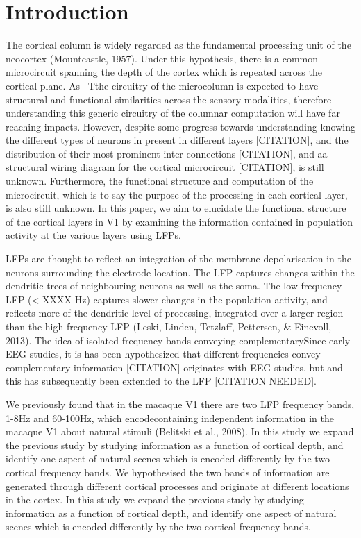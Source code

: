 \section{Introduction}
The cortical column is widely regarded as the fundamental processing unit of the neocortex (Mountcastle, 1957). Under this hypothesis, there is a common microcircuit spanning the depth of the cortex which is repeated across the cortical plane. As \ Tthe circuitry of the microcolumn is expected to have structural and functional similarities across the sensory modalities, therefore understanding this generic circuitry of the columnar computation will have far reaching impacts. However, despite some progress towards understanding knowing the different types of neurons in present in different layers [CITATION], and the distribution of their most prominent inter-connections [CITATION], and aa structural wiring diagram for the cortical microcircuit [CITATION], is still unknown. Furthermore, the functional structure and computation of the microcircuit, which is to say the purpose of the processing in each cortical layer, is also still unknown. In this paper, we aim to elucidate the functional structure of the cortical layers in \ac{V1} by examining the information contained in population activity at the various layers using \acp{LFP}.

\acp{LFP} are thought to reflect an integration of the membrane depolarisation in the neurons surrounding the electrode location. The \ac{LFP} captures changes within the dendritic trees of neighbouring neurons as well as the soma. The low frequency \ac{LFP} ({\textless} XXXX Hz) captures slower changes in the population activity, and reflects more of the dendritic level of processing, integrated over a larger region than the high frequency \ac{LFP} (Leski, Linden, Tetzlaff, Pettersen, \& Einevoll, 2013). The idea of isolated frequency bands conveying complementarySince early \ac{EEG} studies, it is has been hypothesized that different frequencies convey complementary information [CITATION] originates with \ac{EEG} studies, but and this has subsequently been extended to the \ac{LFP} [CITATION NEEDED]. 

We previously found that in the macaque \ac{V1} there are two \ac{LFP} frequency bands, 1-8Hz and 60-100Hz, which encodecontaining independent information in the macaque \ac{V1} about natural stimuli (Belitski et al., 2008). In this study we expand the previous study by studying information as a function of cortical depth, and identify one aspect of natural scenes which is encoded differently by the two cortical frequency bands. We hypothesised the two bands of information are generated through different cortical processes and originate at different locations in the cortex. In this study we expand the previous study by studying information as a function of cortical depth, and identify one aspect of natural scenes which is encoded differently by the two cortical frequency bands.

